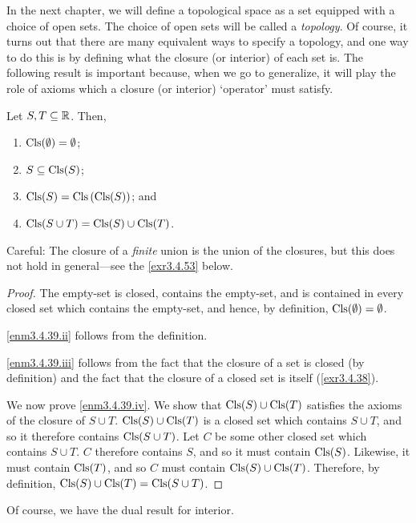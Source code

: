 In the next chapter, we will define a topological space as a set equipped with a choice of open sets.  The choice of open sets will be called a \emph{topology}.  Of course, it turns out that there are many equivalent ways to specify a topology, and one way to do this is by defining what the closure (or interior) of each set is.  The following result is important because, when we go to generalize, it will play the role of axioms which a closure (or interior) `operator' must satisfy.
\begin{thm}
Let $S,T\subseteq \mathbb{R}$.  Then,
\begin{enumerate}
\item \label{enm3.4.39.i}$\operatorname{Cls} (\emptyset) =\emptyset$;
\item \label{enm3.4.39.ii}$S\subseteq \operatorname{Cls} (S)$;
\item \label{enm3.4.39.iii}$\operatorname{Cls} (S)=\operatorname{Cls} \left( \operatorname{Cls} (S)\right)$; and
\item \label{enm3.4.39.iv}$\operatorname{Cls} (S\cup T)=\operatorname{Cls} (S)\cup \operatorname{Cls} (T)$.
\end{enumerate}
\begin{rmk}
Careful:  The closure of a \emph{finite} union is the union of the closures, but this does not hold in general---see the \cref{exr3.4.53} below.
\end{rmk}
\begin{proof}
The empty-set is closed, contains the empty-set, and is contained in every closed set which contains the empty-set, and hence, by definition, $\operatorname{Cls} (\emptyset )=\emptyset$.

\ref{enm3.4.39.ii} follows from the definition.

\ref{enm3.4.39.iii} follows from the fact that the closure of a set is closed (by definition) and the fact that the closure of a closed set is itself (\cref{exr3.4.38}).

We now prove \ref{enm3.4.39.iv}.  We show that $\operatorname{Cls} (S)\cup \operatorname{Cls} (T)$ satisfies the axioms of the closure of $S\cup T$.  $\operatorname{Cls} (S)\cup \operatorname{Cls} (T)$ is a closed set which contains $S\cup T$, and so it therefore contains $\operatorname{Cls} (S\cup T)$.  Let $C$ be some other closed set which contains $S\cup T$.  $C$ therefore contains $S$, and so it must contain $\operatorname{Cls} (S)$.  Likewise, it must contain $\operatorname{Cls} (T)$, and so $C$ must contain $\operatorname{Cls} (S)\cup \operatorname{Cls} (T)$.  Therefore, by definition, $\operatorname{Cls} (S)\cup \operatorname{Cls} (T)=\operatorname{Cls} (S\cup T)$.
\end{proof}
\end{thm}
Of course, we have the dual result for interior.

